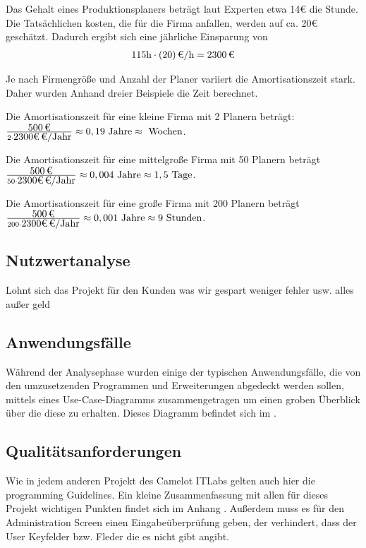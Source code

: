 Das Gehalt eines Produktionsplaners beträgt laut Experten etwa 14€ die Stunde. Die Tatsächlichen kosten, die für die Firma anfallen, werden auf ca. 20€ geschätzt.
Dadurch ergibt sich eine jährliche Einsparung von 
\begin{eqnarray}
115 \mbox{h} \cdot \eur{(20)}{\mbox{/h}} = \eur{2300}
\end{eqnarray}

Je nach Firmengröße und Anzahl der Planer variiert die Amortisationszeit stark. Daher wurden Anhand dreier Beispiele die Zeit berechnet.

Die Amortisationszeit für eine kleine Firma mit 2 Planern beträgt:
$\frac{\eur{500}}{2 \cdot \eur{2300€} \mbox{/Jahr} } \approx 0,19 \mbox{ Jahre} \approx  \mbox{ Wochen}$.

Die Amortisationszeit für eine mittelgroße Firma mit 50 Planern beträgt
$\frac{\eur{500}}{50 \cdot \eur{2300€} \mbox{/Jahr} } \approx 0,004 \mbox{ Jahre} \approx 1,5 \mbox{ Tage}$.

Die Amortisationszeit für eine große Firma mit 200 Planern beträgt
$\frac{\eur{500}}{200 \cdot \eur{2300€} \mbox{/Jahr} } \approx 0,001 \mbox{ Jahre} \approx 9 \mbox{ Stunden}$.

\subsection{Nutzwertanalyse}
\label{sec:Nutzwertanalyse}
Lohnt sich das Projekt für den Kunden was wir gespart weniger fehler usw. alles außer geld


\subsection{Anwendungsfälle}
\label{sec:Anwendungsfaelle}
Während der Analysephase wurden einige der typischen Anwendungsfälle, die von den umzusetzenden Programmen und Erweiterungen abgedeckt werden sollen, mittels eines Use-Case-Diagramms zusammengetragen um einen groben Überblick über die diese zu erhalten. Dieses Diagramm befindet sich im .

\subsection{Qualitätsanforderungen}
\label{sec:Qualitaetsanforderungen}
Wie in jedem anderen Projekt des Camelot ITLabs gelten auch hier die programming Guidelines. Ein kleine Zusammenfassung mit allen für dieses Projekt wichtigen Punkten findet sich im Anhang . Außerdem muss es für den Administration Screen einen Eingabeüberprüfung geben, der verhindert, dass der User Keyfelder bzw. Fleder die es nicht gibt angibt.

